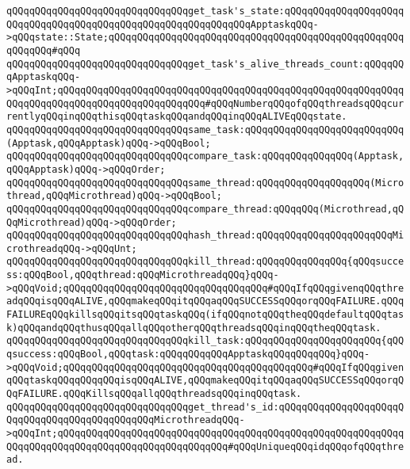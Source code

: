 \verb|qQQqqQQqqQQqqQQqqQQqqQQqqQQqqQQqget_task's_state:qQQqqQQqqQQqqQQqqQQqqQQqqQQqqQQqqQQqqQQqqQQqqQQqqQQqqQQqqQQqqQQqApptaskqQQq->qQQqstate::State;qQQqqQQqqQQqqQQqqQQqqQQqqQQqqQQqqQQqqQQqqQQqqQQqqQQqqQQqqQQq#qQQq|\newline
\verb|qQQqqQQqqQQqqQQqqQQqqQQqqQQqqQQqget_task's_alive_threads_count:qQQqqQQqApptaskqQQq->qQQqInt;qQQqqQQqqQQqqQQqqQQqqQQqqQQqqQQqqQQqqQQqqQQqqQQqqQQqqQQqqQQqqQQqqQQqqQQqqQQqqQQqqQQqqQQqqQQqqQQq#qQQqNumberqQQqofqQQqthreadsqQQqcurrentlyqQQqinqQQqthisqQQqtaskqQQqandqQQqinqQQqALIVEqQQqstate.|\newline
\newline
\verb|qQQqqQQqqQQqqQQqqQQqqQQqqQQqqQQqsame_task:qQQqqQQqqQQqqQQqqQQqqQQqqQQq(Apptask,qQQqApptask)qQQq->qQQqBool;|\newline
\verb|qQQqqQQqqQQqqQQqqQQqqQQqqQQqqQQqcompare_task:qQQqqQQqqQQqqQQq(Apptask,qQQqApptask)qQQq->qQQqOrder;|\newline
\newline
\verb|qQQqqQQqqQQqqQQqqQQqqQQqqQQqqQQqsame_thread:qQQqqQQqqQQqqQQqqQQq(Microthread,qQQqMicrothread)qQQq->qQQqBool;|\newline
\verb|qQQqqQQqqQQqqQQqqQQqqQQqqQQqqQQqcompare_thread:qQQqqQQq(Microthread,qQQqMicrothread)qQQq->qQQqOrder;|\newline
\verb|qQQqqQQqqQQqqQQqqQQqqQQqqQQqqQQqhash_thread:qQQqqQQqqQQqqQQqqQQqqQQqMicrothreadqQQq->qQQqUnt;|\newline
\newline
\verb|qQQqqQQqqQQqqQQqqQQqqQQqqQQqqQQqkill_thread:qQQqqQQqqQQqqQQq{qQQqsuccess:qQQqBool,qQQqthread:qQQqMicrothreadqQQq}qQQq->qQQqVoid;qQQqqQQqqQQqqQQqqQQqqQQqqQQqqQQqqQQq#qQQqIfqQQqgivenqQQqthreadqQQqisqQQqALIVE,qQQqmakeqQQqitqQQqaqQQqSUCCESSqQQqorqQQqFAILURE.qQQqFAILUREqQQqkillsqQQqitsqQQqtaskqQQq(ifqQQqnotqQQqtheqQQqdefaultqQQqtask)qQQqandqQQqthusqQQqallqQQqotherqQQqthreadsqQQqinqQQqtheqQQqtask.|\newline
\verb|qQQqqQQqqQQqqQQqqQQqqQQqqQQqqQQqkill_task:qQQqqQQqqQQqqQQqqQQqqQQq{qQQqsuccess:qQQqBool,qQQqtask:qQQqqQQqqQQqApptaskqQQqqQQqqQQq}qQQq->qQQqVoid;qQQqqQQqqQQqqQQqqQQqqQQqqQQqqQQqqQQqqQQqqQQq#qQQqIfqQQqgivenqQQqtaskqQQqqQQqqQQqisqQQqALIVE,qQQqmakeqQQqitqQQqaqQQqSUCCESSqQQqorqQQqFAILURE.qQQqKillsqQQqallqQQqthreadsqQQqinqQQqtask.|\newline
\newline
\verb|qQQqqQQqqQQqqQQqqQQqqQQqqQQqqQQqget_thread's_id:qQQqqQQqqQQqqQQqqQQqqQQqqQQqqQQqqQQqqQQqqQQqqQQqMicrothreadqQQq->qQQqInt;qQQqqQQqqQQqqQQqqQQqqQQqqQQqqQQqqQQqqQQqqQQqqQQqqQQqqQQqqQQqqQQqqQQqqQQqqQQqqQQqqQQqqQQqqQQqqQQqqQQq#qQQqUniqueqQQqidqQQqofqQQqthread.|\newline
